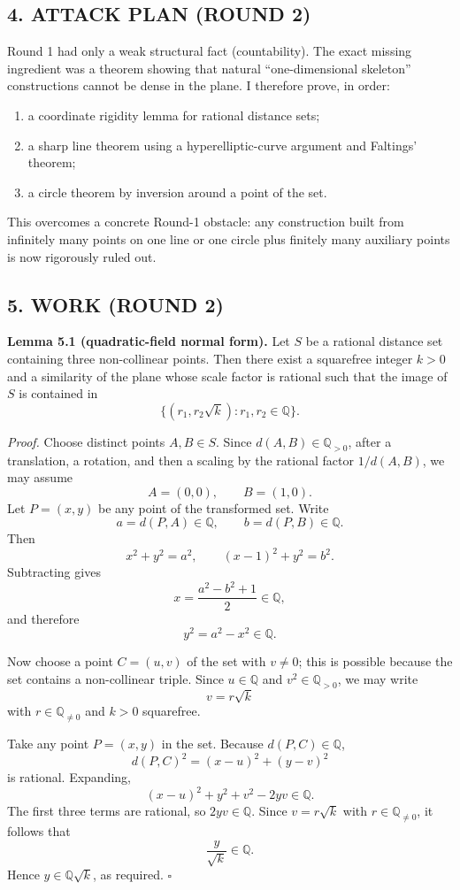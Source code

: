\subsection*{4. ATTACK PLAN (ROUND 2)}
Round 1 had only a weak structural fact (countability). The exact missing ingredient was a theorem showing that natural ``one-dimensional skeleton'' constructions cannot be dense in the plane. I therefore prove, in order:
\begin{enumerate}
\item a coordinate rigidity lemma for rational distance sets;
\item a sharp line theorem using a hyperelliptic-curve argument and Faltings' theorem;
\item a circle theorem by inversion around a point of the set.
\end{enumerate}
This overcomes a concrete Round-1 obstacle: any construction built from infinitely many points on one line or one circle plus finitely many auxiliary points is now rigorously ruled out.

\subsection*{5. WORK (ROUND 2)}

\medskip
\noindent\textbf{Lemma 5.1 (quadratic-field normal form).}
Let $S$ be a rational distance set containing three non-collinear points. Then there exist a squarefree integer $k>0$ and a similarity of the plane whose scale factor is rational such that the image of $S$ is contained in
\[
\{(r_1,r_2\sqrt{k}) : r_1,r_2\in \mathbb{Q}\}.
\]

\smallskip
\noindent\emph{Proof.}
Choose distinct points $A,B\in S$. Since $d(A,B)\in \mathbb{Q}_{>0}$, after a translation, a rotation, and then a scaling by the rational factor $1/d(A,B)$, we may assume
\[
A=(0,0), \qquad B=(1,0).
\]
Let $P=(x,y)$ be any point of the transformed set. Write
\[
a=d(P,A)\in \mathbb{Q}, \qquad b=d(P,B)\in \mathbb{Q}.
\]
Then
\[
x^2+y^2=a^2, \qquad (x-1)^2+y^2=b^2.
\]
Subtracting gives
\[
x=\frac{a^2-b^2+1}{2}\in \mathbb{Q},
\]
and therefore
\[
y^2=a^2-x^2\in \mathbb{Q}.
\]

Now choose a point $C=(u,v)$ of the set with $v\neq 0$; this is possible because the set contains a non-collinear triple. Since $u\in \mathbb{Q}$ and $v^2\in \mathbb{Q}_{>0}$, we may write
\[
v=r\sqrt{k}
\]
with $r\in \mathbb{Q}_{\neq 0}$ and $k>0$ squarefree.

Take any point $P=(x,y)$ in the set. Because $d(P,C)\in \mathbb{Q}$,
\[
d(P,C)^2=(x-u)^2+(y-v)^2
\]
is rational. Expanding,
\[
(x-u)^2+y^2+v^2-2yv \in \mathbb{Q}.
\]
The first three terms are rational, so $2yv\in \mathbb{Q}$. Since $v=r\sqrt{k}$ with $r\in\mathbb{Q}_{\neq 0}$, it follows that
\[
\frac{y}{\sqrt{k}}\in \mathbb{Q}.
\]
Hence $y\in \mathbb{Q}\sqrt{k}$, as required.
\hfill$\square$

